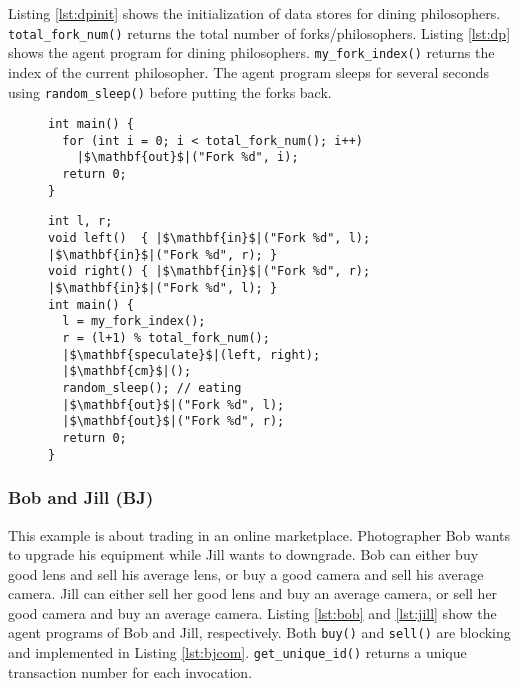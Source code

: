 Listing \ref{lst:dpinit} shows the initialization of data stores 
for dining philosophers.
\texttt{total\_fork\_num()} returns the total number of forks/philosophers.
Listing \ref{lst:dp} shows the agent program for dining philosophers.
\texttt{my\_fork\_index()} returns the index of the current philosopher.
The agent program sleeps for several seconds
using \texttt{random\_sleep()} before putting the forks back.

\begin{figure}[th]
\begin{lstlisting}[label=lst:dpinit,caption=Dining Philosophers (initialization)]
int main() {
  for (int i = 0; i < total_fork_num(); i++)
    |$\mathbf{out}$|("Fork %d", i);
  return 0;
}
\end{lstlisting}

\begin{lstlisting}[label=lst:dp,caption=Dining Philosophers]
int l, r;
void left()  { |$\mathbf{in}$|("Fork %d", l); |$\mathbf{in}$|("Fork %d", r); }
void right() { |$\mathbf{in}$|("Fork %d", r); |$\mathbf{in}$|("Fork %d", l); }
int main() {
  l = my_fork_index();
  r = (l+1) % total_fork_num();
  |$\mathbf{speculate}$|(left, right);
  |$\mathbf{cm}$|();
  random_sleep(); // eating
  |$\mathbf{out}$|("Fork %d", l);
  |$\mathbf{out}$|("Fork %d", r);
  return 0;
}
\end{lstlisting}
\end{figure}

\subsubsection*{Bob and Jill (BJ)}

This example is about trading in an online marketplace. 
Photographer Bob wants to upgrade his equipment while Jill wants to downgrade.
Bob can either buy good lens and sell his average lens, 
or buy a good camera and sell his average camera.
Jill can either sell her good lens and buy an average camera, 
or sell her good camera and buy an average camera.
Listing \ref{lst:bob} and \ref{lst:jill} show the 
agent programs of Bob and Jill, respectively.
Both \texttt{buy()} and \texttt{sell()} are blocking and implemented in Listing \ref{lst:bjcom}.
\texttt{get\_unique\_id()} returns a unique transaction number for 
each invocation.

